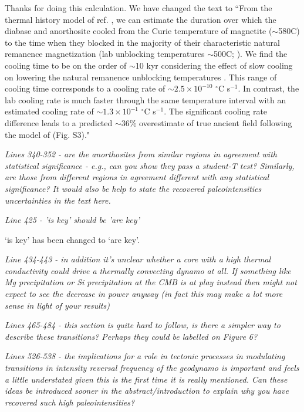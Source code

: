 \documentclass[11pt, letterpaper]{article}
\begin{document}
\begin{flushleft}
Thanks for doing this calculation. We have changed the text to ``From the thermal history model of ref.  \citealp{Zhang2021b}, we can estimate the duration over which the diabase and anorthosite cooled from the Curie temperature of magnetite ($\sim$580\textdegree C) to the time when they blocked in the majority of their characteristic natural remanence magnetization (lab unblocking temperatures $\sim$500\textdegree C;  \citealp{Zhang2021b}). We find the cooling time to be on the order of $\sim$10 kyr considering the effect of slow cooling on lowering the natural remanence unblocking temperatures \cite{Halgedahl1980a}. This range of cooling time corresponds to a cooling rate of $\sim2.5\times10^{-10}$ $^\circ$C s$^{-1}$. In contrast, the lab cooling rate is much faster through the same temperature interval with an estimated cooling rate of $\sim1.3\times10^{-1}$ $^\circ$C s$^{-1}$. The significant cooling rate difference leads to a predicted $\sim$36\% overestimate of true ancient field following the model of \citealp{Halgedahl1980a} (Fig. S3)."

\textit{Lines 340-352 - are the anorthosites from similar regions in agreement with statistical significance - e.g., can you show they pass a student-T test? Similarly, are those from different regions in agreement\/ different with any statistical significance? It would also be help to state the recovered paleointensities\/ uncertainties in the text here.}




\textit{Line 425 - 'is key' should be 'are key'}

`is key' has been changed to `are key'. 

\textit{Line 434-443 - in addition it's unclear whether a core with a high thermal conductivity could drive a thermally convecting dynamo at all. If something like Mg precipitation or Si precipitation at the CMB is at play instead then might not expect to see the decrease in power anyway (in fact this may make a lot more sense in light of your results)}



\textit{Lines 465-484 - this section is quite hard to follow, is there a simpler way to describe these transitions? Perhaps they could be labelled on Figure 6?}



\textit{Lines 526-538 - the implications for a role in tectonic processes in modulating transitions in intensity\/ reversal frequency of the geodynamo is important and feels a little understated given this is the first time it is really mentioned. Can these ideas be introduced sooner in the abstract/introduction to explain why you have recovered such high paleointensities?}




\end{flushleft}
\end{document}
